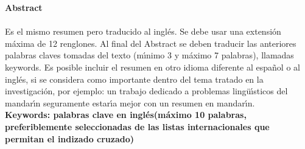 \textbf{\LARGE Abstract}\\\\
Es el mismo resumen pero traducido al ingl\'{e}s. Se debe usar una extensi\'{o}n m\'{a}xima de 12 renglones. Al final del Abstract se deben traducir las anteriores palabras claves tomadas del texto (m\'{\i}nimo 3 y m\'{a}ximo 7 palabras), llamadas keywords. Es posible incluir el resumen en otro idioma diferente al espa\~{n}ol o al ingl\'{e}s, si se considera como importante dentro del tema tratado en la investigaci\'{o}n, por ejemplo: un trabajo dedicado a problemas ling\"{u}\'{\i}sticos del mandar\'{\i}n seguramente estar\'{\i}a mejor con un resumen en mandar\'{\i}n.\\[2.0cm]
\textbf{\small Keywords: palabras clave en ingl\'{e}s(m\'{a}ximo 10 palabras, preferiblemente seleccionadas de las listas internacionales que permitan el indizado cruzado)}\\